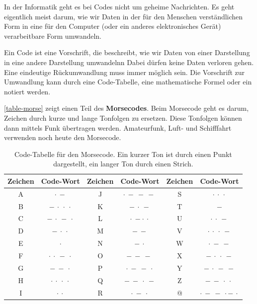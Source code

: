 In der Informatik geht es bei Codes nicht um geheime Nachrichten. Es geht eigentlich meist darum, wie wir Daten in der für den Menschen verständlichen Form in eine für den Computer (oder ein anderes elektronisches Gerät) verarbeitbare Form umwandeln.

\begin{definition}[Code]
Ein Code ist eine Vorschrift, die beschreibt, wie wir Daten von einer Darstellung in eine andere Darstellung umwandelnn Dabei dürfen keine Daten verloren gehen. Eine eindeutige Rückumwandlung muss immer möglich sein. Die Vorschrift zur Umwandlung kann durch eine Code-Tabelle, eine mathematische Formel oder ein  notiert werden.
\end{definition}

\begin{example}
\autoref{table-morse} zeigt einen Teil des \textbf{Morsecodes}. Beim Morsecode geht es darum, Zeichen durch kurze und lange Tonfolgen zu ersetzen. Diese Tonfolgen können dann mittels Funk übertragen werden. Amateurfunk, Luft- und Schifffahrt verwenden noch heute den Morsecode. 

\begin{table}[htb]
\centering
\begin{tabular}{|c|c||c|c||c|c|}
\hline
\textbf{Zeichen} & \textbf{Code-Wort} & \textbf{Zeichen} & \textbf{Code-Wort} & \textbf{Zeichen} & \textbf{Code-Wort} \\ \hline
A & $\cdot~-$ & J & $\cdot~-~-~-~$ & S & $\cdot~\cdot~\cdot$ \\ \hline
B & $-~\cdot~\cdot~\cdot$ & K & $-~\cdot~-$ & T & $-$ \\ \hline
C & $-~\cdot~-~\cdot$ & L & $\cdot~-\cdot~\cdot$ & U & $\cdot~\cdot~-$ \\ \hline
D &  $-~\cdot~\cdot$  & M & $-~-$ & V & $\cdot~\cdot~\cdot~-$ \\ \hline
E & $\cdot$ & N & $-~\cdot$ & W & $\cdot~-~-$ \\ \hline
F & $\cdot~\cdot~-~\cdot$ & O & $-~-~-~$ & X & $-~\cdot~\cdot~-$ \\ \hline
G & $-~-~\cdot$ & P & $\cdot~-~-~\cdot$  & Y & $-~\cdot~-~-$ \\ \hline
H & $\cdot~\cdot~\cdot~\cdot$ & Q & $-~-~\cdot~-$ & Z & $-~-~\cdot~\cdot~$ \\ \hline
I & $\cdot~\cdot$ & R & $\cdot~-~\cdot$ & @ & $\cdot~-~-~\cdot-~\cdot$ \\ \hline
\end{tabular}
\caption{Code-Tabelle für den Morsecode. Ein kurzer Ton ist durch einen Punkt dargestellt, ein langer Ton durch einen Strich.}
\label{table-morse}
\end{table}

\end{example}

